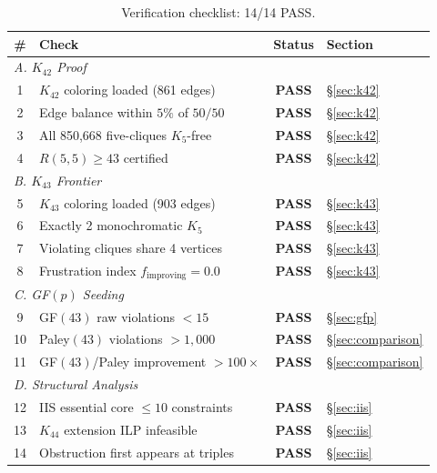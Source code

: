 \documentclass[12pt,a4paper]{article}
\theoremstyle{definition}
\theoremstyle{remark}
\newcommand{\Kn}[1]{K_{#1}}
\begin{document}
\begin{table}[H]
\centering
\caption{Verification checklist: 14/14 PASS.}\label{tab:verification}
\begin{tabular}{@{}clcl@{}}
\toprule
\textbf{\#} & \textbf{Check} & \textbf{Status} & \textbf{Section} \\
\midrule
\multicolumn{4}{l}{\textit{A. $\Kn{42}$ Proof}} \\
1 & $\Kn{42}$ coloring loaded (861 edges) & \textcolor{proved}{\textbf{PASS}} & \S\ref{sec:k42} \\
2 & Edge balance within $5\%$ of $50/50$ & \textcolor{proved}{\textbf{PASS}} & \S\ref{sec:k42} \\
3 & All 850,668 five-cliques $K_5$-free & \textcolor{proved}{\textbf{PASS}} & \S\ref{sec:k42} \\
4 & $R(5,5) \ge 43$ certified & \textcolor{proved}{\textbf{PASS}} & \S\ref{sec:k42} \\
\midrule
\multicolumn{4}{l}{\textit{B. $\Kn{43}$ Frontier}} \\
5 & $\Kn{43}$ coloring loaded (903 edges) & \textcolor{proved}{\textbf{PASS}} & \S\ref{sec:k43} \\
6 & Exactly 2 monochromatic $K_5$ & \textcolor{proved}{\textbf{PASS}} & \S\ref{sec:k43} \\
7 & Violating cliques share 4 vertices & \textcolor{proved}{\textbf{PASS}} & \S\ref{sec:k43} \\
8 & Frustration index $f_{\mathrm{improving}} = 0.0$ & \textcolor{proved}{\textbf{PASS}} & \S\ref{sec:k43} \\
\midrule
\multicolumn{4}{l}{\textit{C. GF$(p)$ Seeding}} \\
9 & GF$(43)$ raw violations $< 15$ & \textcolor{proved}{\textbf{PASS}} & \S\ref{sec:gfp} \\
10 & Paley$(43)$ violations $> 1{,}000$ & \textcolor{proved}{\textbf{PASS}} & \S\ref{sec:comparison} \\
11 & GF$(43)$/Paley improvement $> 100\times$ & \textcolor{proved}{\textbf{PASS}} & \S\ref{sec:comparison} \\
\midrule
\multicolumn{4}{l}{\textit{D. Structural Analysis}} \\
12 & IIS essential core $\le 10$ constraints & \textcolor{proved}{\textbf{PASS}} & \S\ref{sec:iis} \\
13 & $\Kn{44}$ extension ILP infeasible & \textcolor{proved}{\textbf{PASS}} & \S\ref{sec:iis} \\
14 & Obstruction first appears at triples & \textcolor{proved}{\textbf{PASS}} & \S\ref{sec:iis} \\
\bottomrule
\end{tabular}
\end{table}
\end{document}

